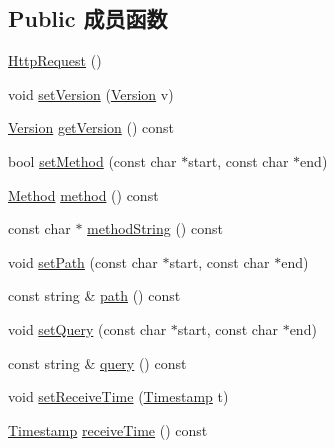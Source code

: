 \subsection*{Public 成员函数}
\begin{DoxyCompactItemize}
\item 
\hyperlink{classmuduo_1_1net_1_1HttpRequest_a785ca311f7569c57a36d9a10a7c128ea}{Http\+Request} ()
\item 
void \hyperlink{classmuduo_1_1net_1_1HttpRequest_ac61fffa5333332c59fa89545d54d86fc}{set\+Version} (\hyperlink{classmuduo_1_1net_1_1HttpRequest_a2256f5bba1c1c69a92b933aa501df470}{Version} v)
\item 
\hyperlink{classmuduo_1_1net_1_1HttpRequest_a2256f5bba1c1c69a92b933aa501df470}{Version} \hyperlink{classmuduo_1_1net_1_1HttpRequest_ae75fb9d6c69d2fc12928d9a0b4489b61}{get\+Version} () const
\item 
bool \hyperlink{classmuduo_1_1net_1_1HttpRequest_ab2416e259145d033c13675213e2d06d9}{set\+Method} (const char $\ast$start, const char $\ast$end)
\item 
\hyperlink{classmuduo_1_1net_1_1HttpRequest_a2a3c0067e44c5ef3210a256d06c16b0f}{Method} \hyperlink{classmuduo_1_1net_1_1HttpRequest_a41065317f311efb2f1798e3a988919b1}{method} () const
\item 
const char $\ast$ \hyperlink{classmuduo_1_1net_1_1HttpRequest_a2258157f0e3801caa7553a9193426cf5}{method\+String} () const
\item 
void \hyperlink{classmuduo_1_1net_1_1HttpRequest_a73d33f4e5e09e0393dee8e362a544bca}{set\+Path} (const char $\ast$start, const char $\ast$end)
\item 
const string \& \hyperlink{classmuduo_1_1net_1_1HttpRequest_a2fb105290147c32827e9d649026f6fd9}{path} () const
\item 
void \hyperlink{classmuduo_1_1net_1_1HttpRequest_ae6a05cbe368686e6d830adabec06c076}{set\+Query} (const char $\ast$start, const char $\ast$end)
\item 
const string \& \hyperlink{classmuduo_1_1net_1_1HttpRequest_a992fd038e5a6f55177f482d011569b84}{query} () const
\item 
void \hyperlink{classmuduo_1_1net_1_1HttpRequest_a5cc87a4f1dc48ca56c63764ae5a0d704}{set\+Receive\+Time} (\hyperlink{classmuduo_1_1Timestamp}{Timestamp} t)
\item 
\hyperlink{classmuduo_1_1Timestamp}{Timestamp} \hyperlink{classmuduo_1_1net_1_1HttpRequest_a2651294d555fd3fc36d838513d2a6663}{receive\+Time} () const
\item 

\end{DoxyCompactItemize}
